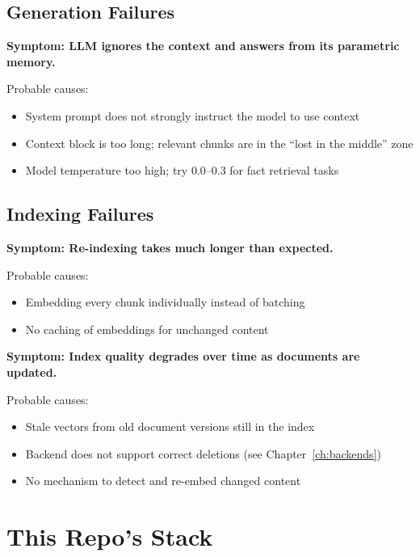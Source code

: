 \subsection{Generation Failures}

\textbf{Symptom: LLM ignores the context and answers from its parametric memory.}

Probable causes:

\begin{itemize}
    \item System prompt does not strongly instruct the model to use context
    \item Context block is too long; relevant chunks are in the ``lost in the middle'' zone
    \item Model temperature too high; try 0.0--0.3 for fact retrieval tasks
\end{itemize}

\subsection{Indexing Failures}

\textbf{Symptom: Re-indexing takes much longer than expected.}

Probable causes:

\begin{itemize}
    \item Embedding every chunk individually instead of batching
    \item No caching of embeddings for unchanged content
\end{itemize}

\textbf{Symptom: Index quality degrades over time as documents are updated.}

Probable causes:

\begin{itemize}
    \item Stale vectors from old document versions still in the index
    \item Backend does not support correct deletions (see Chapter~\ref{ch:backends})
    \item No mechanism to detect and re-embed changed content
\end{itemize}

\section{This Repo's Stack}


